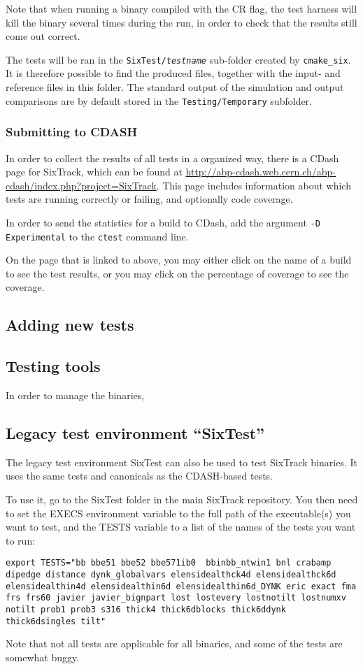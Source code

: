 \documentclass[english,BCOR=0mm,DIV=18]{scrartcl}
\begin{document}
Note that when running a binary compiled with the CR flag, the test harness will kill the binary several times during the run, in order to check that the results still come out correct.

The tests will be ran in the \texttt{SixTest/\textit{testname}} sub-folder created by \texttt{cmake\_six}.
It is therefore possible to find the produced files, together with the input- and reference files in this folder.
The standard output of the simulation and output comparisons are by default stored in the \texttt{Testing/Temporary} subfolder.

\subsubsection{Submitting to CDASH}
In order to collect the results of all tests in a organized way, there is a CDash page for SixTrack, which can be found at \url{http://abp-cdash.web.cern.ch/abp-cdash/index.php?project=SixTrack}.
This page includes information about which tests are running correctly or failing, and optionally code coverage.

In order to send the statistics for a build to CDash, add the argument \texttt{-D Experimental} to the \texttt{ctest} command line.

On the page that is linked to above, you may either click on the name of a build to see the test results, or you may click on the percentage of coverage to see the coverage.

\subsection{Adding new tests}

\subsection{Testing tools}
In order to manage the binaries, 

\subsection{Legacy test environment ``SixTest''}

The legacy test environment SixTest can also be used to test SixTrack binaries.
It uses the same tests and canonicals as the CDASH-based tests.

To use it, go to the SixTest folder in the main SixTrack repository.
You then need to set the EXECS environment variable to the full path of the executable(s) you want to test, and the TESTS variable to a list of the names of the tests you want to run:
\begin{lstlisting}
export TESTS="bb bbe51 bbe52 bbe571ib0  bbinbb_ntwin1 bnl crabamp dipedge distance dynk_globalvars elensidealthck4d elensidealthck6d elensidealthin4d elensidealthin6d elensidealthin6d_DYNK eric exact fma frs frs60 javier javier_bignpart lost lostevery lostnotilt lostnumxv notilt prob1 prob3 s316 thick4 thick6dblocks thick6ddynk thick6dsingles tilt"
\end{lstlisting}
Note that not all tests are applicable for all binaries, and some of the tests are somewhat buggy.
\end{document}
